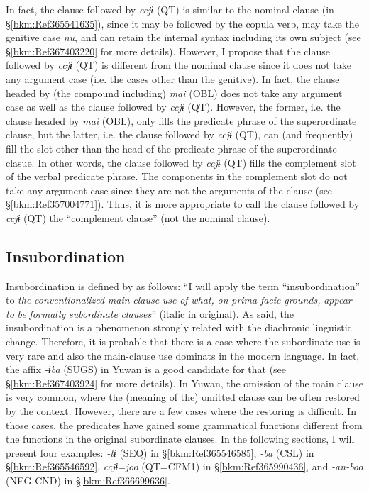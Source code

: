 In fact, the clause followed by \textit{ccjɨ} (QT) is similar to the nominal clause (in §\ref{bkm:Ref365541635}), since it may be followed by the copula verb, may take the genitive case \textit{nu}, and can retain the internal syntax including its own subject (see §\ref{bkm:Ref367403220} for more details). However, I propose that the clause followed by \textit{ccjɨ} (QT) is different from the nominal clause since it does not take any argument case (i.e. the cases other than the genitive). In fact, the clause headed by (the compound including) \textit{mai} (OBL) does not take any argument case as well as the clause followed by \textit{ccjɨ} (QT). However, the former, i.e. the clause headed by \textit{mai} (OBL), only fills the predicate phrase of the superordinate clause, but the latter, i.e. the clause followed by \textit{ccjɨ} (QT), can (and frequently) fill the slot other than the head of the predicate phrase of the superordinate clasue. In other words, the clause followed by \textit{ccjɨ} (QT) fills the complement slot of the verbal predicate phrase. The components in the complement slot do not take any argument case since they are not the arguments of the clause (see §\ref{bkm:Ref357004771}). Thus, it is more appropriate to call the clause followed by \textit{ccjɨ} (QT) the “complement clause” (not the nominal clause).

\subsection{Insubordination}
\label{bkm:Ref365191910}\hypertarget{RefHeadingToc395697256}{}
Insubordination is defined by \citet[367]{Evans2007} as follows: “I will apply the term “insubordination” to \textit{the} \textit{conventionalized} \textit{main} \textit{clause} \textit{use} \textit{of} \textit{what,} \textit{on} \textit{prima} \textit{facie} \textit{grounds,} \textit{appear} \textit{to} \textit{be} \textit{formally} \textit{subordinate} \textit{clauses}” (italic in original). As \citet[367]{Evans2007} said, the insubordination is a phenomenon strongly related with the diachronic linguistic change. Therefore, it is probable that there is a case where the subordinate use is very rare and also the main-clause use dominats in the modern language. In fact, the affix \textit{{}-ɨba} (SUGS) in Yuwan is a good candidate for that (see §\ref{bkm:Ref367403924} for more details). In Yuwan, the omission of the main clause is very common, where the (meaning of the) omitted clause can be often restored by the context. However, there are a few cases where the restoring is difficult. In those cases, the predicates have gained some grammatical functions different from the functions in the original subordinate clauses. In the following sections, I will present four examples: \textit{-tɨ} (SEQ) in §\ref{bkm:Ref365546585}, \textit{{}-ba} (CSL) in §\ref{bkm:Ref365546592}, \textit{ccjɨ=joo} (QT=CFM1) in §\ref{bkm:Ref365990436}, and \textit{{}-an-boo} (NEG-CND) in §\ref{bkm:Ref366699636}.

